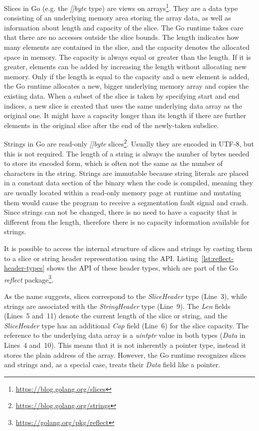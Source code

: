 Slices in Go (e.g. the \textit{[]byte} type) are views on arrays\footnote{\url{https://blog.golang.org/slices}}.
They are a data type consisting of an underlying memory area storing the array data, as well as information about length
and capacity of the slice.
The Go runtime takes care that there are no accesses outside the slice bounds.
The length indicates how many elements are contained in the slice, and the capacity denotes the allocated space in
memory.
The capacity is always equal or greater than the length.
If it is greater, elements can be added by increasing the length without allocating new memory.
Only if the length is equal to the capacity and a new element is added, the Go runtime allocates a new, bigger
underlying memory array and copies the existing data.
When a subset of the slice is taken by specifying start and end indices, a new slice is created that uses the same
underlying data array as the original one.
It might have a capacity longer than its length if there are further elements in the original slice after the end of
the newly-taken subslice.

Strings in Go are read-only \textit{[]byte} slices\footnote{\url{https://blog.golang.org/strings}}.
Usually they are encoded in UTF-8, but this is not required.
The length of a string is always the number of bytes needed to store its encoded form, which is often not the same as
the number of characters in the string.
Strings are immutable because string literals are placed in a constant data section of the binary when the code is
compiled, meaning they are usually located within a read-only memory page at runtime and mutating them would cause
the program to receive a segmentation fault signal and crash.
Since strings can not be changed, there is no need to have a capacity that is different from the length, therefore there
is no capacity information available for strings.

It is possible to access the internal structure of slices and strings by casting them to a slice or string header
representation using the \unsafe{} \acrshort{API}.
Listing~\ref{lst:reflect-header-types} shows the \acrshort{API} of these header types, which are part of the Go
\textit{reflect} package\footnote{\url{https://golang.org/pkg/reflect}}.



As the name suggests, slices correspond to the \textit{SliceHeader} type (Line~3), while strings are associated with the
\textit{StringHeader} type (Line~9).
The \textit{Len} fields (Lines~5 and~11) denote the current length of the slice or string, and the \textit{SliceHeader}
type has an additional \textit{Cap} field (Line~6) for the slice capacity.
The reference to the underlying data array is a \textit{uintptr} value in both types (\textit{Data} in Lines~4 and~10).
This means that it is not inherently a pointer type, instead it stores the plain address of the array.
However, the Go runtime recognizes slices and strings and, as a special case, treats their \textit{Data} field like a
pointer.

